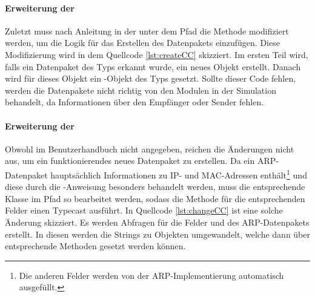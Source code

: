 \paragraph{Erweiterung der }
\begin{program}[ht]
	}]{listings/createCC.lst}
	\caption{Auszug aus der Create.cc} 
	\label{lst:createCC}
\end{program}
Zuletzt muss nach Anleitung in der  unter dem Pfad  die Methode  modifiziert werden, um die Logik für das Erstellen des Datenpakets einzufügen. Diese Modifizierung wird in dem Quellcode \ref{lst:createCC} skizziert. Im ersten Teil wird, falls ein Datenpaket des Typs  erkannt wurde, ein neues Objekt  erstellt. Danach wird für dieses Objekt ein -Objekt des Typs  gesetzt. Sollte dieser Code fehlen, werden die Datenpakete nicht richtig von den Modulen in der Simulation behandelt, da Informationen über den Empfänger oder Sender fehlen.

\paragraph{Erweiterung der }
\begin{program}[ht]
	}]{listings/changeCC.lst}
	\caption{Auszug aus der Change.cc} 
	\label{lst:changeCC}
\end{program}
Obwohl im Benutzerhandbuch nicht angegeben, reichen die Änderungen nicht aus, um ein funktionierendes neues Datenpaket zu erstellen. Da ein ARP-Datenpaket hauptsächlich Informationen zu IP- und MAC-Adressen enthält\footnote{Die anderen Felder werden von der ARP-Implementierung automatisch ausgefüllt.} und diese durch die -Anweisung besonders behandelt werden, muss die entsprechende Klasse im Pfad  so bearbeitet werden, sodass die Methode  für die entsprechenden Felder einen Typecast ausführt. In Quellcode \ref{lst:changeCC} ist eine solche Änderung skizziert. Es werden Abfragen für die Felder  und  des ARP-Datenpakets erstellt. In diesen werden  die Strings zu Objekten umgewandelt, welche dann über entsprechende Methoden gesetzt werden können.

